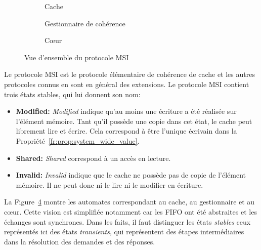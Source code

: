 \begin{figure}[hbtp]
   \begin{center}
     \begin{subfigure}[b]{0.5\linewidth}
       \resizebox{\linewidth}{!}{
      }
      \caption{Cache}
      \label{fr:fig:general_msi_cc}
   \end{subfigure}
   \begin{subfigure}[b]{0.3\linewidth}
      \resizebox{\linewidth}{!}{
      }
      \caption{Gestionnaire de cohérence}
      \label{fr:fig:general_msi_cmgr}
   \end{subfigure}
   \begin{subfigure}[b]{0.1\linewidth}
 \resizebox{\linewidth}{!}{
     }
      \caption{Cœur}
      \label{fr:fig:general_msi_cpu}
   \end{subfigure}
   \end{center}
   \caption{Vue d'ensemble du protocole MSI}
   \label{fr:fig:general_msi}
\end{figure}


Le protocole MSI est le protocole élémentaire de cohérence de cache
et les autres protocoles connus en sont en général des extensions.
Le protocole MSI contient trois états stables, qui lui donnent son nom:
\begin{itemize}
  \setlength{\itemsep}{0pt}%
   \setlength{\parskip}{0pt}%
\item \textbf{Modified:}
\textit{Modified}
indique qu'au moins une écriture a été réalisée sur l'élément mémoire. Tant qu'il possède une copie dans cet état, le
cache peut librement lire et écrire. Cela correspond à être l'unique écrivain
dans la Propriété~\ref{fr:prop:system_wide_value}.

\item \textbf{Shared:}
  \textit{Shared}
  correspond à un accès en lecture.

\item \textbf{Invalid:}
\textit{Invalid} indique que le cache ne possède pas de copie
de l'élément mémoire. Il ne peut donc ni le lire ni le modifier en écriture.
\end{itemize}

La Figure~\ref{fr:fig:general_msi} montre les automates correspondant
au cache, au gestionnaire et au c\oe ur. Cette vision est simplifiée
notamment car les FIFO ont été abstraites et les échanges sont synchrones.
Dans les faits, il faut distinguer les états \textit{stables}
ceux représentés ici des états
\textit{transients}, qui
représentent des étapes intermédiaires dans la résolution des demandes et des réponses.

